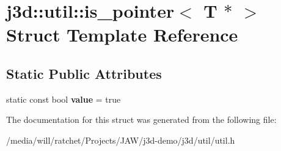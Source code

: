 \hypertarget{structj3d_1_1util_1_1is__pointer_3_01T_01_5_01_4}{}\section{j3d\+:\+:util\+:\+:is\+\_\+pointer$<$ T $\ast$ $>$ Struct Template Reference}
\label{structj3d_1_1util_1_1is__pointer_3_01T_01_5_01_4}
\subsection*{Static Public Attributes}
\begin{DoxyCompactItemize}
\item 
\hypertarget{structj3d_1_1util_1_1is__pointer_3_01T_01_5_01_4_ad4412846dd8d83bde541ac102f8be48c}{}static const bool {\bfseries value} = true\label{structj3d_1_1util_1_1is__pointer_3_01T_01_5_01_4_ad4412846dd8d83bde541ac102f8be48c}

\end{DoxyCompactItemize}


The documentation for this struct was generated from the following file\+:\begin{DoxyCompactItemize}
\item 
/media/will/ratchet/\+Projects/\+J\+A\+W/j3d-\/demo/j3d/util/util.\+h\end{DoxyCompactItemize}
